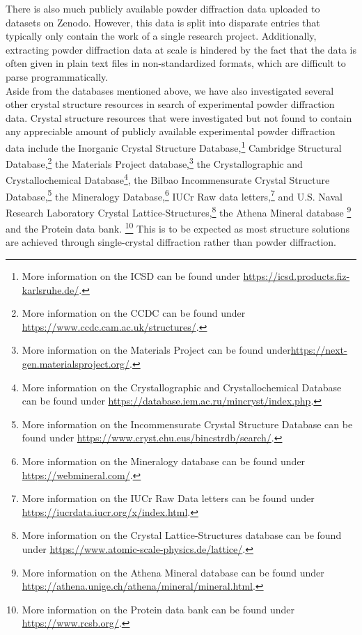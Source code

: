 There is also much publicly available powder diffraction data uploaded to datasets on Zenodo. However, this data is split into disparate entries that typically only contain the work of a single research project. Additionally, extracting powder diffraction data at scale is hindered by the fact that the data is often given in plain text files in non-standardized formats, which are difficult to parse programmatically. \\

Aside from the databases mentioned above, we have also investigated several other crystal structure resources in search of experimental powder diffraction data. Crystal structure resources that were investigated but not found to contain any appreciable amount of publicly available experimental powder diffraction data include the Inorganic Crystal Structure Database,\footnote{More information on the ICSD can be found under \url{https://icsd.products.fiz-karlsruhe.de/}.}   Cambridge Structural Database,\footnote{More information on the CCDC can be found under \url{https://www.ccdc.cam.ac.uk/structures/}.}  the Materials Project database,\footnote{More information on the Materials Project can be found under\url{https://next-gen.materialsproject.org/}.}  the Crystallographic and Crystallochemical Database\footnote{More information on the Crystallographic and Crystallochemical Database can be found under \url{https://database.iem.ac.ru/mincryst/index.php}.},  the Bilbao Incommensurate Crystal Structure Database,\footnote{More information on the Incommensurate Crystal Structure Database can be found under \url{https://www.cryst.ehu.eus/bincstrdb/search/}.}  the Mineralogy Database,\footnote{More information on the Mineralogy database can be found under \url{https://webmineral.com/}.} IUCr Raw data letters,\footnote{More information on the IUCr Raw Data letters can be found under \url{https://iucrdata.iucr.org/x/index.html}.} and U.S. Naval Research Laboratory Crystal Lattice-Structures,\footnote{More information on the Crystal Lattice-Structures database can be found under \url{https://www.atomic-scale-physics.de/lattice/}.} the Athena Mineral database \footnote{More information on the Athena Mineral database can be found under \url{https://athena.unige.ch/athena/mineral/mineral.html}.} and the Protein data bank. \footnote{More information on the Protein data bank can be found under \url{https://www.rcsb.org/}.} This is to be expected as most structure solutions are achieved through single-crystal diffraction rather than powder diffraction.\\

